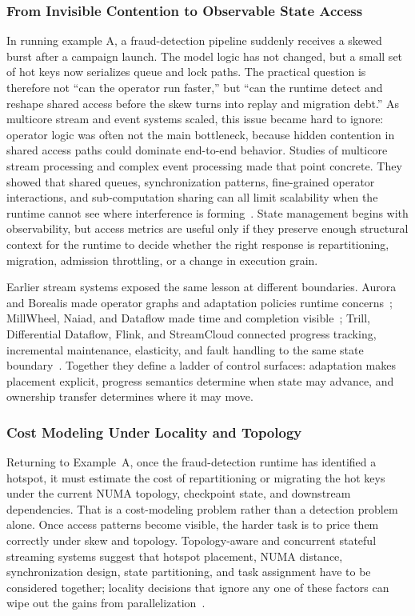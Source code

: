 \documentclass[manuscript]{acmart}
\begin{document}
\subsubsection{From Invisible Contention to Observable State Access}

In running example A, a fraud-detection pipeline suddenly receives a skewed burst after a campaign launch. The model logic has not changed, but a small set of hot keys now serializes queue and lock paths. The practical question is therefore not ``can the operator run faster,'' but ``can the runtime detect and reshape shared access before the skew turns into replay and migration debt.'' As multicore stream and event systems scaled, this issue became hard to ignore: operator logic was often not the main bottleneck, because hidden contention in shared access paths could dominate end-to-end behavior. Studies of multicore stream processing and complex event processing made that point concrete. They showed that shared queues, synchronization patterns, fine-grained operator interactions, and sub-computation sharing can all limit scalability when the runtime cannot see where interference is forming~\cite{zhang2017revisiting,zhang2017mqo}. State management begins with observability, but access metrics are useful only if they preserve enough structural context for the runtime to decide whether the right response is repartitioning, migration, admission throttling, or a change in execution grain.

Earlier stream systems exposed the same lesson at different boundaries. Aurora and Borealis made operator graphs and adaptation policies runtime concerns~\cite{abadi2003aurora,abadi2005borealis}; MillWheel, Naiad, and Dataflow made time and completion visible~\cite{akidau2013millwheel,murray2013naiad,akidau2015dataflow}; Trill, Differential Dataflow, Flink, and StreamCloud connected progress tracking, incremental maintenance, elasticity, and fault handling to the same state boundary~\cite{chandramouli2014trill,murray2013differential,carbone2015flink,gulisano2012streamcloud}. Together they define a ladder of control surfaces: adaptation makes placement explicit, progress semantics determine when state may advance, and ownership transfer determines where it may move.

\subsubsection{Cost Modeling Under Locality and Topology}

Returning to Example~A, once the fraud-detection runtime has identified a hotspot, it must estimate the cost of repartitioning or migrating the hot keys under the current NUMA topology, checkpoint state, and downstream dependencies. That is a cost-modeling problem rather than a detection problem alone. Once access patterns become visible, the harder task is to price them correctly under skew and topology. Topology-aware and concurrent stateful streaming systems suggest that hotspot placement, NUMA distance, synchronization design, state partitioning, and task assignment have to be considered together; locality decisions that ignore any one of these factors can wipe out the gains from parallelization~\cite{zhang2019briskstream,zhang2020concurrent}.
\end{document}
